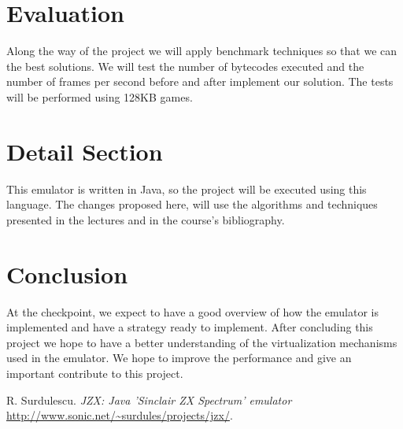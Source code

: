 \documentclass[times, 10pt,twocolumn]{scrartcl}
\begin{document}
\section{Evaluation}
Along the way of the project we will apply benchmark techniques so that we can the best solutions. We will test the number of bytecodes executed and the number of frames per second before and after implement our solution. The tests will be performed using 128KB games.

\section{Detail Section}
This emulator is written in Java, so the project will be executed using this language.
The changes proposed here, will use the algorithms and techniques presented in the lectures and in the course's bibliography.

\section{Conclusion}
At the checkpoint, we expect to have a good overview of how the emulator is implemented and have a strategy ready to implement. After concluding this project we hope to have a better understanding of the virtualization mechanisms used in the emulator. We hope to improve the performance and give an important contribute to this project.




\begin{thebibliography}{1}

   R. Surdulescu. {\em JZX: Java 'Sinclair ZX Spectrum' emulator}  \url{http://www.sonic.net/~surdules/projects/jzx/}.

\end{thebibliography}
\end{document}

